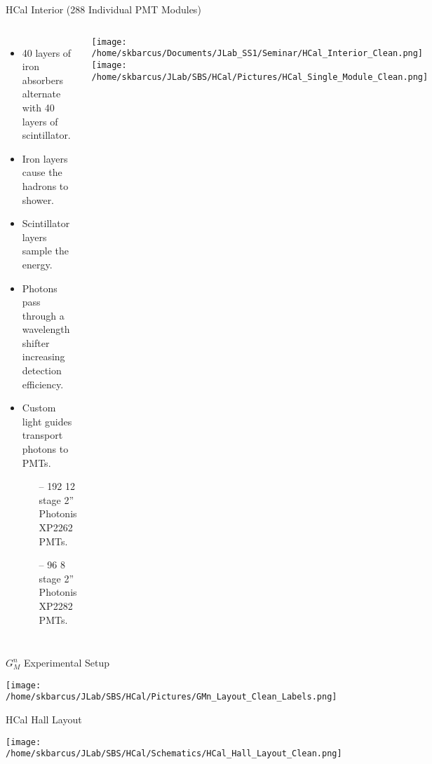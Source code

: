 \documentclass[10pt]{beamer}
\begin{document}
\begin{frame}{HCal Interior (288 Individual PMT Modules)}

    \begin{columns}[T,onlytextwidth]
  	
  	\begin{itemize}
  		\item 40 layers of iron absorbers alternate with 40 layers of scintillator.
		\item Iron layers cause the hadrons to shower. 
		\item Scintillator layers sample the energy.
		\item Photons pass through a wavelength shifter increasing detection efficiency.
		\item Custom light guides transport photons to PMTs.
			\begin{itemize}
				\item[--] 192 12 stage 2'' Photonis XP2262 PMTs.
				\item[--] 96 8 stage 2'' Photonis XP2282 PMTs.
			\end{itemize}
  	\end{itemize}

  	
  	\begin{center}
  		\vspace{5mm}
  		\texttt{[image: /home/skbarcus/Documents/JLab\_SS1/Seminar/HCal\_Interior\_Clean.png]}
		\vspace{10mm}
  		\texttt{[image: /home/skbarcus/JLab/SBS/HCal/Pictures/HCal\_Single\_Module\_Clean.png]}
  	\end{center}
  	
	\end{columns}
	
\end{frame}

\begin{frame}{$G_M^n$ Experimental Setup}

	\begin{center}
		\texttt{[image: /home/skbarcus/JLab/SBS/HCal/Pictures/GMn\_Layout\_Clean\_Labels.png]}
	\end{center}

\end{frame}

\begin{frame}{HCal Hall Layout}

	\begin{center}
		\texttt{[image: /home/skbarcus/JLab/SBS/HCal/Schematics/HCal\_Hall\_Layout\_Clean.png]}
	\end{center}
\end{frame}
\end{document}
